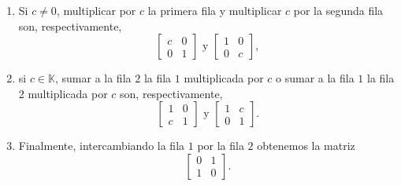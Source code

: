 \documentclass{article}
\theoremstyle{definition}
\theoremstyle{definition}
\theoremstyle{remark}
\begin{document}
\begin{enumerate}[label=\textcolor{azulp2}{E\arabic*.}]
  \item Si $ c \neq 0$, multiplicar por $c$ la primera fila y multiplicar $c$ por la segunda fila son, respectivamente, \[
      \begin{bmatrix} c & 0 \\ 0 & 1 \end{bmatrix} \text{ y } \begin{bmatrix}1 & 0 \\ 0 & c \end{bmatrix},
    \]
  \item si $c \in \mathbb{K}$, sumar a la fila $2$ la fila $1$ multiplicada por $c$ o sumar a la fila $1$ la fila $2$ multiplicada por $c$ son, respectivamente, \[
      \begin{bmatrix} 1 & 0 \\ c & 1 \end{bmatrix} \text{ y } \begin{bmatrix}1 & c \\ 0 & 1 \end{bmatrix}.
    \]
  \item Finalmente, intercambiando la fila $1$ por la fila $2$ obtenemos la matriz \[
      \begin{bmatrix}0 & 1 \\ 1 & 0 \end{bmatrix}. 
    \]
 \end{enumerate}
 \pagebreak
\end{document}
